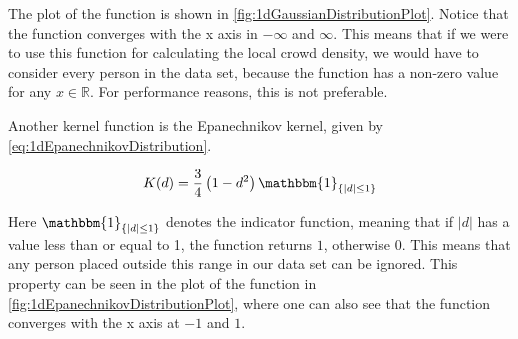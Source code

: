 The plot of the function is shown in \cref{fig:1dGaussianDistributionPlot}. Notice that the function converges with the x axis in $-\infty$ and $\infty$. This means that if we were to use this function for calculating the local crowd density, we would have to consider every person in the data set, because the function has a non-zero value for any $x \in \mathbb{R}$. For performance reasons, this is not preferable.

Another kernel function is the Epanechnikov kernel, given by \cref{eq:1dEpanechnikovDistribution}.

\begin{equation}
\label{eq:1dEpanechnikovDistribution}
K(d) = \frac{3}{4} \left( 1-d^2 \right) \mathbbm{1}_{\{\left| d \right| \leq 1\}}
\end{equation}

Here $\mathbbm{1}_{\{|d| \leq 1\}}$ denotes the indicator function, meaning that if $|d|$ has a value less than or equal to 1, the function returns $1$, otherwise $0$. This means that any person placed outside this range in our data set can be ignored. This property can be seen in the plot of the function in \cref{fig:1dEpanechnikovDistributionPlot}, where one can also see that the function converges with the x axis at $-1$ and $1$.

